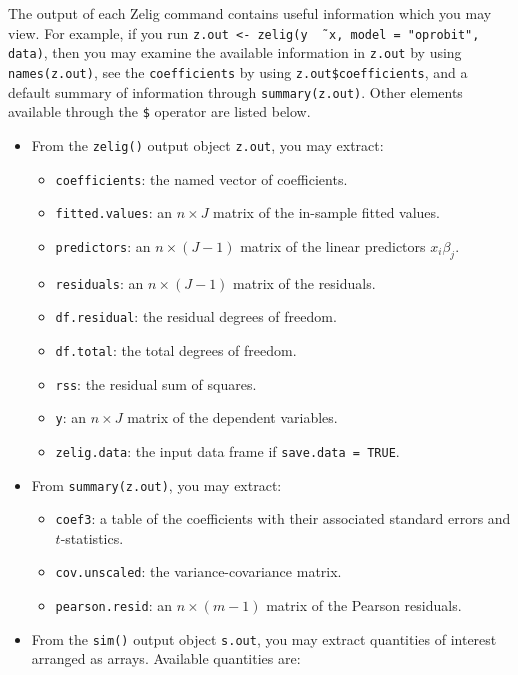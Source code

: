 The output of each Zelig command contains useful information which you
may view.  For example, if you run \texttt{z.out <- zelig(y \~\,
  x, model = "oprobit", data)}, then you may examine the available
information in \texttt{z.out} by using \texttt{names(z.out)},
see the {\tt coefficients} by using {\tt z.out\$coefficients}, and
a default summary of information through \texttt{summary(z.out)}.
Other elements available through the {\tt \$} operator are listed
below.

\begin{itemize}
\item From the {\tt zelig()} output object {\tt z.out}, you may
  extract:
   \begin{itemize}
   \item {\tt coefficients}: the named vector of coefficients.   
   \item {\tt fitted.values}: an $n \times J$ matrix of the in-sample
     fitted values.
   \item {\tt predictors}: an $n \times (J-1)$ matrix of the linear
     predictors $x_i \beta_j$.
   \item {\tt residuals}: an $n \times (J-1)$ matrix of the residuals.  
   \item {\tt df.residual}: the residual degrees of freedom.  
   \item {\tt df.total}: the total degrees of freedom.
   \item {\tt rss}: the residual sum of squares.  
   \item {\tt y}: an $n \times J$ matrix of the dependent variables.
   \item {\tt zelig.data}: the input data frame if {\tt save.data = TRUE}.  
   \end{itemize}

\item From {\tt summary(z.out)}, you may extract:
\begin{itemize}
  \item {\tt coef3}: a table of the coefficients with their associated
    standard errors and $t$-statistics.
  \item {\tt cov.unscaled}: the variance-covariance matrix. 
  \item {\tt pearson.resid}: an $n \times (m-1)$ matrix of the Pearson residuals.  
\end{itemize}

 \item From the {\tt sim()} output object {\tt s.out}, you may extract
   quantities of interest arranged as arrays.  Available quantities
   are:


\end{itemize}
